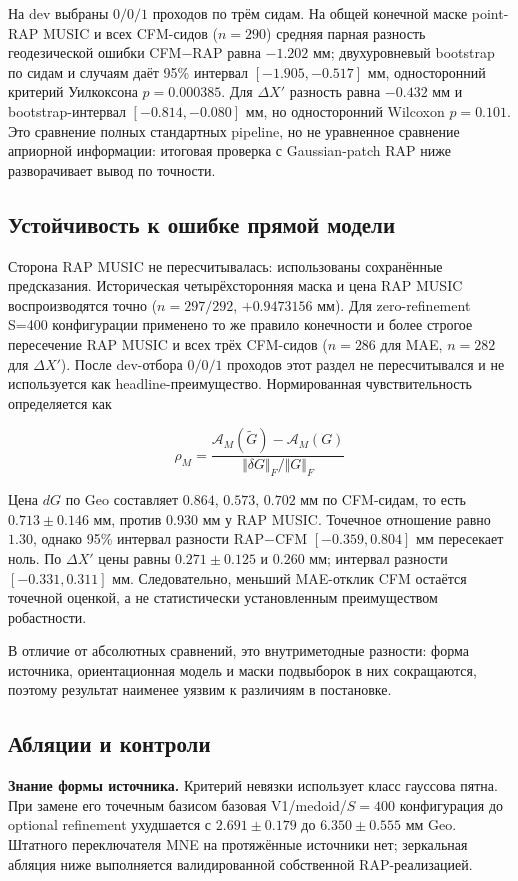 На dev выбраны $0/0/1$ проходов по трём сидам. На общей конечной маске point-RAP MUSIC и всех CFM-сидов ($n=290$) средняя парная разность геодезической ошибки CFM$-$RAP равна $-1.202$ мм; двухуровневый bootstrap по сидам и случаям даёт 95\% интервал $[-1.905,-0.517]$ мм, односторонний критерий Уилкоксона $p=0.000385$. Для $\Delta X'$ разность равна $-0.432$ мм и bootstrap-интервал $[-0.814,-0.080]$ мм, но односторонний Wilcoxon $p=0.101$. Это сравнение полных стандартных pipeline, но не уравненное сравнение априорной информации: итоговая проверка с Gaussian-patch RAP ниже разворачивает вывод по точности.

\subsection{Устойчивость к ошибке прямой модели}

Сторона RAP MUSIC не пересчитывалась: использованы сохранённые предсказания. Историческая четырёхсторонняя маска и цена RAP MUSIC воспроизводятся точно ($n=297/292$, $+0.9473156$ мм). Для zero-refinement S=400 конфигурации применено то же правило конечности и более строгое пересечение RAP MUSIC и всех трёх CFM-сидов ($n=286$ для MAE, $n=282$ для $\Delta X'$). После dev-отбора $0/0/1$ проходов этот раздел не пересчитывался и не используется как headline-преимущество. Нормированная чувствительность определяется как

$$\rho_M=\frac{\mathcal{A}_M(\tilde G)-\mathcal{A}_M(G)}{\Vert \delta G\Vert_F/\Vert G\Vert_F}$$

Цена $dG$ по Geo составляет $0.864$, $0.573$, $0.702$ мм по CFM-сидам, то есть $0.713\pm0.146$ мм, против $0.930$ мм у RAP MUSIC. Точечное отношение равно $1.30$, однако 95\% интервал разности RAP$-$CFM $[-0.359,0.804]$ мм пересекает ноль. По $\Delta X'$ цены равны $0.271\pm0.125$ и $0.260$ мм; интервал разности $[-0.331,0.311]$ мм. Следовательно, меньший MAE-отклик CFM остаётся точечной оценкой, а не статистически установленным преимуществом робастности.

В отличие от абсолютных сравнений, это внутриметодные разности: форма источника, ориентационная модель и маски подвыборок в них сокращаются, поэтому результат наименее уязвим к различиям в постановке.

\subsection{Абляции и контроли}

\textbf{Знание формы источника.} Критерий невязки использует класс гауссова пятна. При замене его точечным базисом базовая V1/medoid/$S=400$ конфигурация до optional refinement ухудшается с $2.691\pm0.179$ до $6.350\pm0.555$ мм Geo. Штатного переключателя MNE на протяжённые источники нет; зеркальная абляция ниже выполняется валидированной собственной RAP-реализацией.

